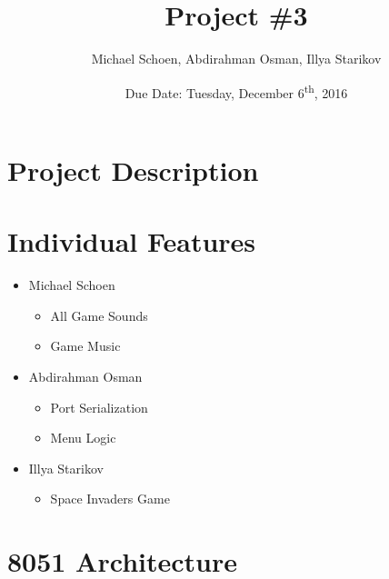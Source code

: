 \documentclass[12pt]{article}
\title{Project \#3}
\date{Due Date: Tuesday, December 6\textsuperscript{th}, 2016}
\author{Michael Schoen, Abdirahman Osman, Illya Starikov}
\begin{document}
\maketitle

\section{Project Description}
\section{Individual Features}
\begin{itemize}
    \item Michael Schoen
    \begin{itemize}
        \item All Game Sounds
        \item Game Music
    \end{itemize}

    \item Abdirahman Osman
    \begin{itemize}
        \item Port Serialization
        \item Menu Logic
    \end{itemize}

    \item Illya Starikov
    \begin{itemize}
        \item Space Invaders Game
    \end{itemize}
\end{itemize}

\section{8051 Architecture}
\end{document}
